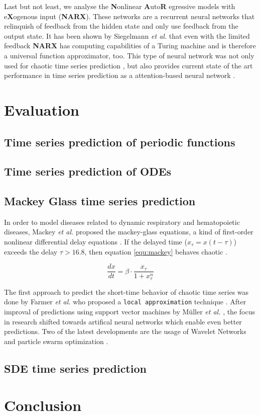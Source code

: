 \documentclass{article}
\begin{document}
Last but not least, we analyse the \textbf{N}onlinear \textbf{A}uto\textbf{R}
egressive models with e\textbf{X}ogenous input (\textbf{NARX}).
These networks are a recurrent
neural networks that relinquish of feedback from the hidden state and only use
feedback from the output state. It has been shown by Siegelmann \textit{et al.}
that even with the limited feedback \textbf{NARX} has computing capabilities of
a Turing machine \cite{siegelmann1997} and is therefore a universal function
approximator, too. This type of neural network was not only used for chaotic
time series prediction \cite{diaconescu2008}, but also provides current 
state of the art performance in time series prediction as a attention-based
neural network \cite{qin2017}.

\section{Evaluation}
\subsection{Time series prediction of periodic functions}
\label{sec:sine}


\subsection{Time series prediction of ODEs}
 
\subsection{Mackey Glass time series prediction}

In order to model diseases related to dynamic respiratory and hematopoietic 
diseases, Mackey \textit{et al.} proposed the mackey-glass equations, a kind of 
first-order nonlinear differential delay equations \cite{mackey1977}. If the 
delayed time ($x_{\tau} = x(t - \tau)$) exceeds the delay $\tau > 16.8$, then 
equation \ref{equ:mackey} behaves chaotic \cite{farmer1982}.

\begin{equation}
  \frac{dx}{dt} = \beta \cdot \frac{x_{\tau}}{1 + x_{\tau}^n}
  \label{equ:mackey}
\end{equation}

The first approach to predict the short-time behavior of chaotic time series
was done by Farmer \textit{et al.} who proposed a \texttt{local approximation}
technique \cite{farmer1987}. After improval of predictions using support vector
machines by Müller \textit{et al.} \cite{muller1997}, the focus in research
shifted towards artifical neural networks which enable even better predictions.
Two of the latest developments are the usage of Wavelet Networks
\cite{alexandridis2013} and particle swarm optimization \cite{caraballo2016}.


\subsection{SDE time series prediction}
    
\section{Conclusion}



\end{document}

